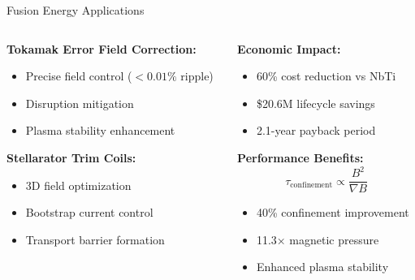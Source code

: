 \documentclass[aspectratio=169,xcolor={table,dvipsnames}]{beamer}
\begin{document}
\begin{frame}{Fusion Energy Applications}
    \begin{columns}
        \begin{column}{0.5\textwidth}
            \textbf{Tokamak Error Field Correction:}
            \begin{itemize}
                \item Precise field control ($<0.01\%$ ripple)
                \item Disruption mitigation
                \item Plasma stability enhancement
            \end{itemize}
            
            \vspace{0.5cm}
            \textbf{Stellarator Trim Coils:}
            \begin{itemize}
                \item 3D field optimization
                \item Bootstrap current control
                \item Transport barrier formation
            \end{itemize}
        \end{column}
        \begin{column}{0.5\textwidth}
            \textbf{Economic Impact:}
            \begin{itemize}
                \item 60\% cost reduction vs NbTi
                \item \$20.6M lifecycle savings
                \item 2.1-year payback period
            \end{itemize}
            
            \vspace{0.3cm}
            \textbf{Performance Benefits:}
            \begin{equation}
                \tau_{\text{confinement}} \propto \frac{B^2}{\nabla B}
            \end{equation}
            
            \begin{itemize}
                \item 40\% confinement improvement
                \item 11.3× magnetic pressure
                \item Enhanced plasma stability
            \end{itemize}
        \end{column}
    \end{columns}
\end{frame}
\end{document}
